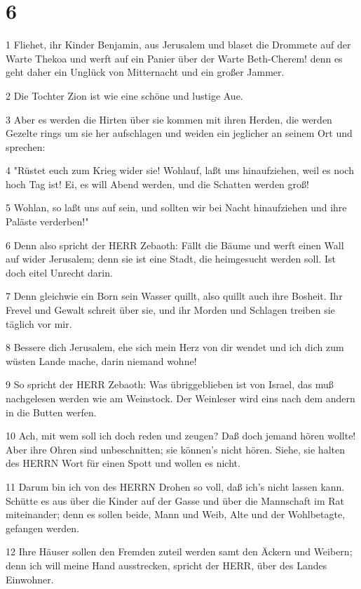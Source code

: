 \chapter{6}

\par 1 Fliehet, ihr Kinder Benjamin, aus Jerusalem und blaset die Drommete auf der Warte Thekoa und werft auf ein Panier über der Warte Beth-Cherem! denn es geht daher ein Unglück von Mitternacht und ein großer Jammer.
\par 2 Die Tochter Zion ist wie eine schöne und lustige Aue.
\par 3 Aber es werden die Hirten über sie kommen mit ihren Herden, die werden Gezelte rings um sie her aufschlagen und weiden ein jeglicher an seinem Ort und sprechen:
\par 4 "Rüstet euch zum Krieg wider sie! Wohlauf, laßt uns hinaufziehen, weil es noch hoch Tag ist! Ei, es will Abend werden, und die Schatten werden groß!
\par 5 Wohlan, so laßt uns auf sein, und sollten wir bei Nacht hinaufziehen und ihre Paläste verderben!"
\par 6 Denn also spricht der HERR Zebaoth: Fällt die Bäume und werft einen Wall auf wider Jerusalem; denn sie ist eine Stadt, die heimgesucht werden soll. Ist doch eitel Unrecht darin.
\par 7 Denn gleichwie ein Born sein Wasser quillt, also quillt auch ihre Bosheit. Ihr Frevel und Gewalt schreit über sie, und ihr Morden und Schlagen treiben sie täglich vor mir.
\par 8 Bessere dich Jerusalem, ehe sich mein Herz von dir wendet und ich dich zum wüsten Lande mache, darin niemand wohne!
\par 9 So spricht der HERR Zebaoth: Was übriggeblieben ist von Israel, das muß nachgelesen werden wie am Weinstock. Der Weinleser wird eins nach dem andern in die Butten werfen.
\par 10 Ach, mit wem soll ich doch reden und zeugen? Daß doch jemand hören wollte! Aber ihre Ohren sind unbeschnitten; sie können's nicht hören. Siehe, sie halten des HERRN Wort für einen Spott und wollen es nicht.
\par 11 Darum bin ich von des HERRN Drohen so voll, daß ich's nicht lassen kann. Schütte es aus über die Kinder auf der Gasse und über die Mannschaft im Rat miteinander; denn es sollen beide, Mann und Weib, Alte und der Wohlbetagte, gefangen werden.
\par 12 Ihre Häuser sollen den Fremden zuteil werden samt den Äckern und Weibern; denn ich will meine Hand ausstrecken, spricht der HERR, über des Landes Einwohner.
